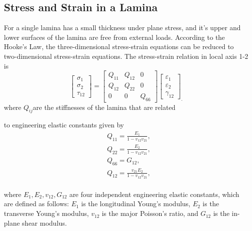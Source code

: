 \subsection{Stress and Strain in a Lamina}
For a single lamina has a small thickness under plane stress, and it's upper and lower surfaces of the lamina are
free from external loads. According to the Hooke's Law, the three-dimensional stress-strain equations can be reduced to
two-dimensional stress-strain equations. The stress-strain relation in local axis 1-2 is
\begin{equation}
    \begin{bmatrix}
        \sigma _1\\
        \sigma _2\\
        \tau_{12}
    \end{bmatrix}
    =
    \begin{bmatrix}
        Q_{11} & Q_{12} & 0\\
        Q_{12} & Q_{22} & 0\\
        0      &  0     & Q_{66}
    \end{bmatrix}
    \begin{bmatrix}
        \varepsilon_1\\
        \varepsilon_2\\\gamma_{12}
	\end{bmatrix}_{\textstyle .} 
\end{equation}
where $Q_{ij} $are the stiffnesses of the lamina that are related

to engineering elastic constants given by
\begin{equation}
    \begin{split}
	&Q_{11}=\frac{E_1}{1-v_{12}v_{21}},\\
	&Q_{22}=\frac{E_2}{1-v_{12}v_{21}},\\
	&Q_{66}=G_{12},\\
	&Q_{12}=\frac{v_{21}E_2}{1-v_{12}v_{21}},\\
    \end{split}
\end{equation}

where $E_1, E_2, v_{12}, G_{12} $ are four independent engineering elastic constants, which are defined as follows: $E_1 $ is the longitudinal Young's modulus, $E_2 $ is the transverse Young's modulus, $v_{12} $ is the major Poisson's ratio, and $G_{12} $ is the in-plane shear modulus.

